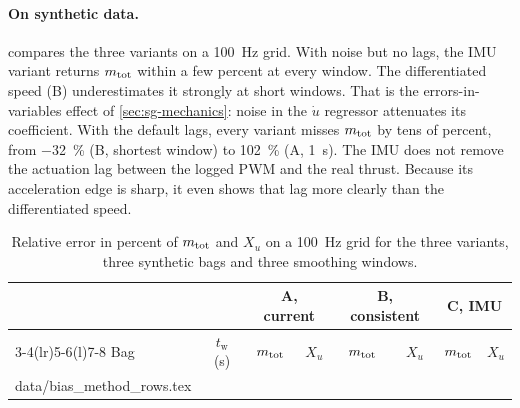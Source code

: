 \paragraph{On synthetic data.}  compares the three variants on a
\qty{100}{\hertz} grid. With noise but no lags, the IMU variant returns $m_\mathrm{tot}$ within a few
percent at every window. The differentiated speed (B) underestimates it strongly at short
windows. That is the errors-in-variables effect of \cref{sec:sg-mechanics}: noise in the $\dot u$
regressor attenuates its coefficient. With the default lags, every variant misses $m_\mathrm{tot}$ by
tens of percent, from \qty{-32}{\percent} (B, shortest window) to \qty{+102}{\percent} (A,
\qty{1}{\second}). The IMU does not remove the actuation lag between the logged PWM
and the real thrust. Because its acceleration edge is sharp, it even shows that lag more
clearly than the differentiated speed.

\begin{table}[htbp]
\centering
\caption{Relative error in percent of $m_\mathrm{tot}$ and $X_u$ on a \qty{100}{\hertz} grid for the three
variants, three synthetic bags and three smoothing windows.}
\label{tab:bias-method}
\small
\begin{tabular}{@{}lc cc cc cc@{}}
\toprule
& & \multicolumn{2}{c}{A, current} & \multicolumn{2}{c}{B, consistent} & \multicolumn{2}{c}{C, IMU} \\
\cmidrule(lr){3-4}\cmidrule(lr){5-6}\cmidrule(l){7-8}
Bag & $t_\mathrm{w}$ (\unit{\second}) & $m_\mathrm{tot}$ & $X_u$ & $m_\mathrm{tot}$ & $X_u$ & $m_\mathrm{tot}$ & $X_u$ \\
\midrule
{} data/bias_method_rows.tex
\bottomrule
\end{tabular}
\end{table}
\FloatBarrier

